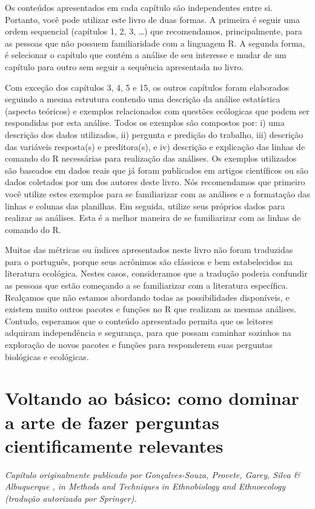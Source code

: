 \documentclass[
]{book}
\begin{document}
Os conteúdos apresentados em cada capítulo são independentes entre si. Portanto, você pode utilizar este livro de duas formas. A primeira é seguir uma ordem sequencial (capítulos 1, 2, 3, \ldots) que recomendamos, principalmente, para as pessoas que não possuem familiaridade com a linguagem R. A segunda forma, é selecionar o capítulo que contém a análise de seu interesse e mudar de um capítulo para outro sem seguir a sequência apresentada no livro.

Com exceção dos capítulos 3, 4, 5 e 15, os outros capítulos foram elaborados seguindo a mesma estrutura contendo uma descrição da análise estatística (aspecto teóricos) e exemplos relacionados com questões ecólogicas que podem ser respondidas por esta análise. Todos os exemplos são compostos por: i) uma descrição dos dados utilizados, ii) pergunta e predição do trabalho, iii) descrição das variáveis resposta(s) e preditora(s), e iv) descrição e explicação das linhas de comando do R necessárias para realização das análises. Os exemplos utilizados são baseados em dados reais que já foram publicados em artigos científicos ou são dados coletados por um dos autores deste livro. Nós recomendamos que primeiro você utilize estes exemplos para se familiarizar com as análises e a formatação das linhas e colunas das planilhas. Em seguida, utilize seus próprios dados para realizar as análises. Esta é a melhor maneira de se familiarizar com as linhas de comando do R.

Muitas das métricas ou índices apresentados neste livro não foram traduzidas para o português, porque seus acrônimos são clássicos e bem estabelecidos na literatura ecológica. Nestes casos, consideramos que a tradução poderia confundir as pessoas que estão começando a se familiarizar com a literatura específica. Realçamos que não estamos abordando todas as possibilidades disponíveis, e existem muito outros pacotes e funções no R que realizam as mesmas análises. Contudo, esperamos que o conteúdo apresentado permita que os leitores adquiram independência e segurança, para que possam caminhar sozinhos na exploração de novos pacotes e funções para responderem suas perguntas biológicas e ecológicas.

\hypertarget{cap3}{%
\chapter{Voltando ao básico: como dominar a arte de fazer perguntas cientificamente relevantes}\label{cap3}}

\emph{Capítulo originalmente publicado por Gonçalves-Souza, Provete, Garey, Silva \& Albuquerque \citeyearpar{albuquerque_going_2019}, in Methods and Techniques in Ethnobiology and Ethnoecology (tradução autorizada por Springer).}
\end{document}

